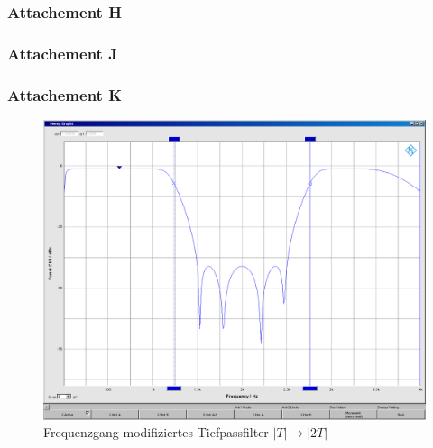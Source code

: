 \subsubsection{Attachement H}


\subsubsection{Attachement J}


\subsubsection{Attachement K}

	\begin{figure}[h]
		\centering
		\includegraphics[width=0.7\linewidth]{Bilder/ellip2T}
		\caption{Frequenzgang modifiziertes Tiefpassfilter $|T| \rightarrow |2T|$}
		\label{fig:ellip2T}
	\end{figure}
